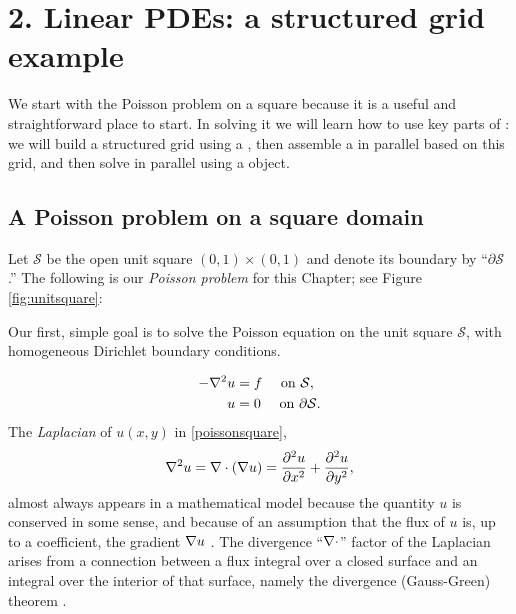 
\chapter{2. Linear PDEs: a structured grid example}

We start with the Poisson problem on a square because it is a useful and straightforward place to start.  In solving it we will learn how to use key parts of \PETSc: we will build a structured grid using a \PETSc \pDMDA, then assemble a \pMat in parallel based on this grid, and then solve in parallel using a \pKSP object.

\section{A Poisson problem on a square domain}

Let $\mathcal{S}$ be the open unit square $(0,1)\times(0,1)$ and denote its boundary by ``$\partial\mathcal{S}$.'' The following is our \emph{Poisson problem} for this Chapter;  see Figure \ref{fig:unitsquare}:
\begin{marginfigure}
\caption{Our first, simple goal is to solve the Poisson equation on the unit square $\mathcal{S}$, with homogeneous Dirichlet boundary conditions.}
\label{fig:unitsquare}
\end{marginfigure}
\begin{align}
- \nabla^2 u &= f \quad \text{ on } \mathcal{S}, \label{poissonsquare} \\
u &= 0 \quad \text{ on } \partial \mathcal{S}. \label{poissonsquarebcs}
\end{align}
The \emph{Laplacian} of $u(x,y)$ in \eqref{poissonsquare},
    $$\nabla^2 u = \nabla\cdot(\nabla u) = \frac{\partial^2 u}{\partial x^2} + \frac{\partial^2 u}{\partial y^2},$$
almost always appears in a mathematical model because the quantity $u$ is conserved in some sense, and because of an assumption that the flux of $u$ is, up to a coefficient, the gradient $\nabla u$ \citep{Ockendonetal2003}.  The divergence ``$\nabla\cdot$'' factor of the Laplacian arises from a connection between a flux integral over a closed surface and an integral over the interior of that surface, namely the divergence (Gauss-Green) theorem \citep[Appendix C]{Evans}.

